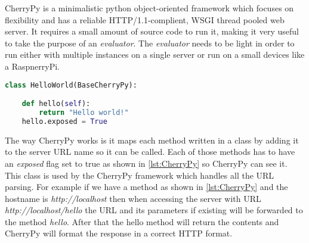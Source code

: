 CherryPy is a minimalistic python object-oriented framework which focuses on flexibility and has a reliable HTTP/1.1-complient, WSGI thread
pooled web server. It requires a small amount of source code to run it, making it very useful to take the purpose of an \textit{evaluator}. The \textit{evaluator}
needs to be light in order to run either with multiple instances on a single server or run on a small devices like a RaspnerryPi.

\begin{lstlisting}[language=Python,caption={Example CherryPy webservice that has the method "hello"},label={lst:CherryPy}]
class HelloWorld(BaseCherryPy):

    def hello(self):
        return "Hello world!"
    hello.exposed = True

	\end{lstlisting}
The way CherryPy works is it maps each method written in a class by adding it to the server URL name so it can be called. Each of those methods has to have
 an \textit{exposed} flag set to true as shown in \ref{lst:CherryPy} so CherryPy can see it. This class is used by the CherryPy framework which handles
all the URL parsing. For example if we have a method as shown in \ref{lst:CherryPy} and the hostname is \textit{http://localhost} then when accessing the server
with URL \textit{http://localhost/hello} the URL and its parameters if existing will be forwarded to the method \textit{hello}. After that the hello method
will return the contents and CherryPy will format the response in a correct HTTP format.
